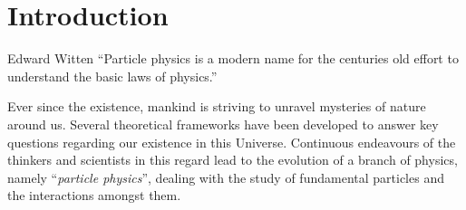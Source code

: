 \chapter{Introduction} %
\label{cha:standard_model__vector_boson_scattering}

\begin{chapquote}
{Edward Witten}
``Particle physics is a modern name for the centuries old effort to understand the basic laws of physics.''
\end{chapquote}
Ever since the existence, mankind is striving to unravel mysteries of nature around us. Several theoretical frameworks have been developed to answer key questions regarding our existence in this Universe. Continuous endeavours of the thinkers and scientists in this regard lead to the evolution of a branch of physics, namely ``\textit{particle physics}'', dealing with the study of fundamental particles and the interactions amongst them. 


